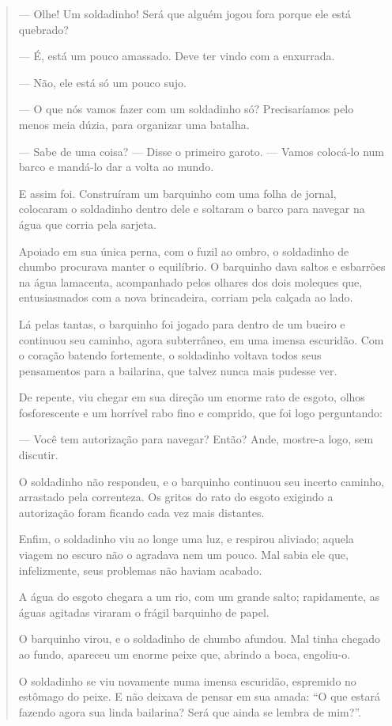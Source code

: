 \begin{quote}
--- Olhe! Um soldadinho! Será que alguém jogou fora porque ele está
quebrado?

--- É, está um pouco amassado. Deve ter vindo com a enxurrada.

--- Não, ele está só um pouco sujo.

--- O que nós vamos fazer com um soldadinho só? Precisaríamos pelo menos
meia dúzia, para organizar uma batalha.

--- Sabe de uma coisa? --- Disse o primeiro garoto. --- Vamos colocá-lo
num barco e mandá-lo dar a volta ao mundo.

E assim foi. Construíram um barquinho com uma folha de jornal, colocaram
o soldadinho dentro dele e soltaram o barco para navegar na água que
corria pela sarjeta.

Apoiado em sua única perna, com o fuzil ao ombro, o soldadinho de chumbo
procurava manter o equilíbrio. O barquinho dava saltos e esbarrões na
água lamacenta, acompanhado pelos olhares dos dois moleques que,
entusiasmados com a nova brincadeira, corriam pela calçada ao lado.

Lá pelas tantas, o barquinho foi jogado para dentro de um bueiro e
continuou seu caminho, agora subterrâneo, em uma imensa escuridão. Com o
coração batendo fortemente, o soldadinho voltava todos seus pensamentos
para a bailarina, que talvez nunca mais pudesse ver.

De repente, viu chegar em sua direção um enorme rato de esgoto, olhos
fosforescente e um horrível rabo fino e comprido, que foi logo
perguntando:

--- Você tem autorização para navegar? Então? Ande, mostre-a logo, sem
discutir.

O soldadinho não respondeu, e o barquinho continuou seu incerto caminho,
arrastado pela correnteza. Os gritos do rato do esgoto exigindo a
autorização foram ficando cada vez mais distantes.

Enfim, o soldadinho viu ao longe uma luz, e respirou aliviado; aquela
viagem no escuro não o agradava nem um pouco. Mal sabia ele que,
infelizmente, seus problemas não haviam acabado.

A água do esgoto chegara a um rio, com um grande salto; rapidamente, as
águas agitadas viraram o frágil barquinho de papel.

O barquinho virou, e o soldadinho de chumbo afundou. Mal tinha chegado
ao fundo, apareceu um enorme peixe que, abrindo a boca, engoliu-o.

O soldadinho se viu novamente numa imensa escuridão, espremido no
estômago do peixe. E não deixava de pensar em sua amada: ``O que estará
fazendo agora sua linda bailarina? Será que ainda se lembra de mim?''.


\end{quote}

